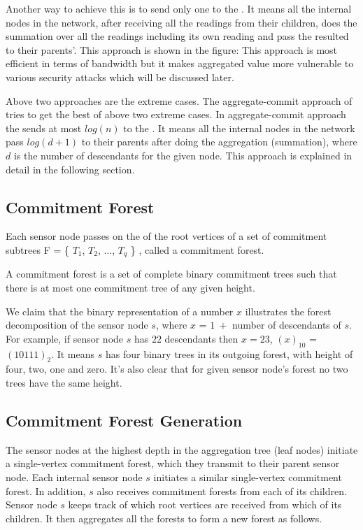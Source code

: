 		Another way to achieve this is to send only one \payload to the \q.
		It means all the internal nodes in the network, after receiving all the readings from their children, does the summation over all the readings including its own reading and pass the resulted \payload to their parents'.
		This approach is shown in the figure:
		This approach is most efficient in terms of bandwidth but it makes aggregated value more vulnerable to various security attacks which will be discussed later.

		Above two approaches are the extreme cases. The aggregate-commit approach of \cite{chan2006secure} tries to get the best of above two extreme cases.
		In aggregate-commit approach the \bs sends at most $log(n)$ \payloads to the \q. 
		It means all the internal nodes in the network pass $log(d + 1)$ \payloads to their parents after doing the aggregation (summation), where $d$ is the number of descendants for the given node. 
		This approach is explained in detail in the following section.     


	\subsection{Commitment Forest}
		Each sensor node passes on the \payloads of the root vertices of a set of commitment subtrees F = \{ $T_{1}$, $T_{2}$, $\dotsc$, $T_{q}$ \} , called  a commitment forest.

		\begin{definition}\cite{chan2006secure}
		A commitment forest is a set of complete binary commitment trees such that there is at most one commitment tree of any given height.
		\end{definition}

		We claim that the binary representation of a number $x$ illustrates the forest decomposition of the sensor node $s$, where $x$ = $1\ +$ number of descendants of $s$.
		For example, if sensor node $s$ has $22$ descendants then $x =23$, $(x)_{10}$ = $(10111)_{2}$. 
		It means $s$ has four binary trees in its outgoing forest, with height of four, two, one and zero. It's also clear that for given sensor node's forest no two trees have the same height.

	\subsection{Commitment Forest Generation}
		The sensor nodes at the highest depth in the aggregation tree (leaf nodes) initiate a single-vertex commitment forest, which they transmit to their parent sensor node.
		Each internal sensor node $s$ initiates a similar single-vertex commitment forest.
		In addition, $s$ also receives commitment forests from each of its children.
		Sensor node $s$ keeps track of which root vertices are received from which of its children.
		It then aggregates all the forests to form a new forest as follows.
		
